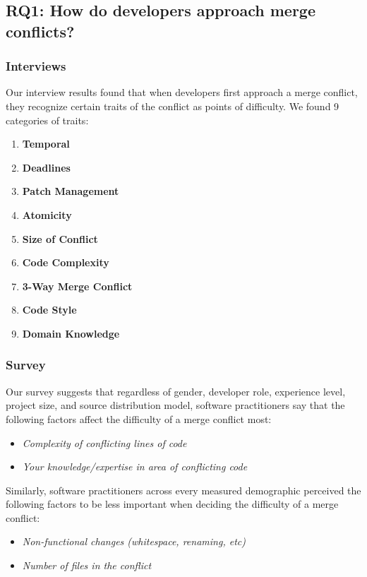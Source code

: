 \subsection{RQ1: How do developers approach merge conflicts?}\label{RQ1}

\subsubsection{Interviews}

Our interview results found that when developers first approach a merge conflict, they recognize certain traits of the conflict as points of difficulty. We found 9 categories of traits:
\begin{enumerate}
\item \textbf{Temporal}
\item \textbf{Deadlines}
\item \textbf{Patch Management}
\item \textbf{Atomicity}
\item \textbf{Size of Conflict}
\item \textbf{Code Complexity}
\item \textbf{3-Way Merge Conflict}
\item \textbf{Code Style}
\item \textbf{Domain Knowledge}
\end{enumerate}


\subsubsection{Survey}
Our survey suggests that regardless of gender, developer role, experience level, project size, and source distribution model, software practitioners say that the following factors affect the difficulty of a merge conflict most: 
\begin{itemize}
\item \textit{Complexity of conflicting lines of code}
\item \textit{Your knowledge/expertise in area of conflicting code}
\end{itemize}

Similarly, software practitioners across every measured demographic perceived the following factors to be less important when deciding the difficulty of a merge conflict:
\begin{itemize}
\item \textit{Non-functional changes (whitespace, renaming, etc)}
\item \textit{Number of files in the conflict}
\end{itemize}

